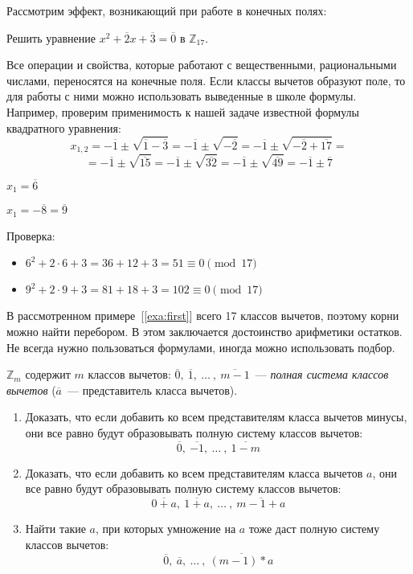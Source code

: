 \documentclass[russian]{lecture-notes}
\newcommand{\klas}[1]{\overline{#1}}
\begin{document}
Рассмотрим эффект, возникающий при работе в конечных полях:
\begin{example}
	Решить уравнение
	$x^2+\klas{2}x+\klas{3}=\klas{0}$ в $\mathbb{Z}_{17}$. 
	
	Все операции и свойства, которые работают с вещественными, рациональными числами, переносятся на конечные поля. Если классы вычетов образуют поле, то для работы с ними можно использовать выведенные в школе формулы. Например, проверим применимость к нашей задаче известной формулы квадратного уравнения:
	\[ x_{1,2} = -\klas{1} \pm \sqrt{\klas{1}-\klas{3}} = -\klas{1} \pm \sqrt{-\klas{2}} = -\klas{1} \pm \sqrt{-\klas{2}+\klas{17}} =\]
	\[ = -\klas{1} \pm \sqrt{\klas{15}} = -\klas{1} \pm \sqrt{\klas{32}} = -\klas{1} \pm \sqrt{\klas{49}} = -\klas{1} \pm \klas{7} \]
	
	$x_1 = \klas{6}$
		
	$x_1 = -\klas{8} = \klas{9}$
	
	Проверка:
	\begin{itemize}
		\item $6^2 + 2 \cdot 6 + 3 = 36 + 12 + 3 = 51 \equiv 0 \pmod{17}$
		\item $9^2 + 2 \cdot 9 + 3 = 81 + 18 + 3 = 102 \equiv 0 \pmod{17}$
	\end{itemize}
	\label{exa:first}
\end{example}

\begin{note*}
	В рассмотренном примере~[\ref{exa:first}] всего 17 классов вычетов, поэтому корни можно найти перебором. В этом заключается достоинство арифметики остатков. Не всегда нужно пользоваться формулами, иногда можно использовать подбор.
\end{note*}

\begin{note*}
	$\mathbb{Z}_m$ содержит $m$ классов вычетов: $\klas{0}, \ \klas{1}, \ \dots \ , \  \klas{m-1}$~--- \emph{полная система классов вычетов} ($\klas{a}$~--- представитель класса вычетов).
\end{note*}

\begin{problem}
	\begin{enumerate}
		\item Доказать, что если добавить ко всем представителям класса вычетов минусы, они все равно будут образовывать полную систему классов вычетов:
		\[ \klas{0}, \ \klas{-1}, \ \dots \ , \  \klas{1-m} \]
		\item Доказать, что если добавить ко всем представителям класса вычетов $a$, они все равно будут образовывать полную систему классов вычетов:
		\[ \klas{0+a}, \ \klas{1+a}, \ \dots \ , \  \klas{m-1+a} \]
		\item Найти такие $a$, при которых умножение на $a$ тоже даст полную систему классов вычетов:
		\[ \klas{0}, \ \klas{a}, \ \dots \ , \  \klas{(m-1)*a} \]
	\end{enumerate}
\end{problem}
\end{document}
